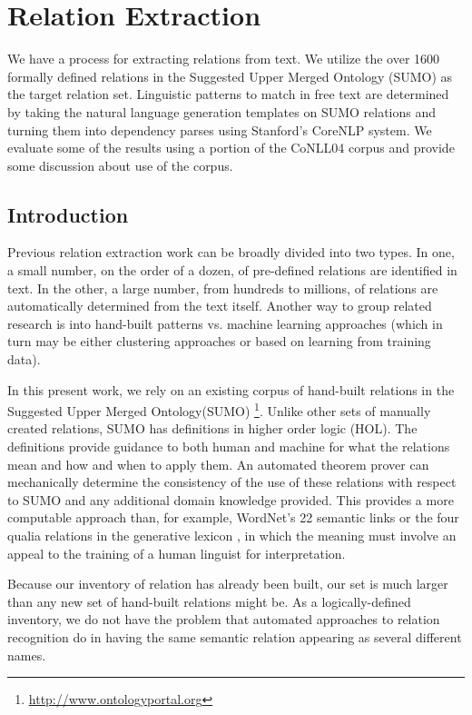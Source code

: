 \documentclass{book}
\begin{document}
\chapter{Relation Extraction}

  We have a process for extracting relations from text.  We utilize
the over 1600 formally defined relations in the Suggested Upper Merged
Ontology (SUMO) as the target relation set.  Linguistic patterns to match
in free text are determined by taking the natural language generation
templates on SUMO relations and turning them into dependency parses using
Stanford's CoreNLP system. We evaluate some of the results using a portion of the 
CoNLL04 corpus and provide some discussion about use of the corpus.

\section{Introduction}

Previous relation extraction work can be broadly divided into two types. In one,
a small number, on the order of a dozen, of pre-defined relations are identified
in text. In the other, a large number, from hundreds to millions, of relations
are automatically determined from the text itself.  Another way to group related
research is into hand-built patterns \citep{Grishman:1993:NYU:1072017.1072036,
Hearst:1992:AAH:992133.992154} vs. machine learning approaches (which in turn
may be either clustering approaches or based on learning from training data).

In this present work, we rely on an existing corpus of hand-built relations in
the Suggested Upper Merged Ontology(SUMO)
\citep{np01,p11}\footnote{\url{http://www.ontologyportal.org}}.  Unlike other
sets of manually created relations, SUMO has definitions in higher order logic
(HOL).  The definitions provide guidance to both human and machine for what the
relations mean and how and when to apply them.  An automated theorem prover
\citep{TheoremProving} can mechanically determine the consistency of the use of
these relations with respect to SUMO and any additional domain knowledge
provided. This provides a more computable approach than, for example, WordNet's 22
semantic links \citep{Fellbaum1998wordnet} or the four qualia relations in the
generative lexicon \citep{Pustejovsky:1991:GL:176321.176324}, in which the
meaning must involve an appeal to the training of a human linguist for
interpretation.

Because our inventory of relation has already been built, our set is much larger
than any new set of hand-built relations might be.  As a logically-defined 
inventory, we do not have the problem that automated approaches to relation
recognition do in having the same semantic relation appearing as several different
names.
\end{document}
